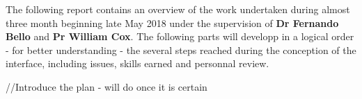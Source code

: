 \newline \vspace{5mm}
The following report contains an overview of the work undertaken during almost three month beginning late May 2018 under the supervision of \textbf{Dr Fernando Bello} and \textbf{Pr William Cox}. The following parts will developp in a logical order - for better understanding - the several steps reached during the conception of the interface, including issues, skills earned and personnal review. 

\newline \vspace{5mm}
//Introduce the plan - will do once it is certain

  


 





